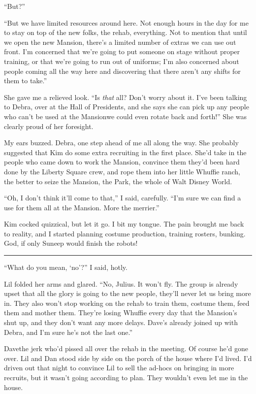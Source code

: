 “But?”

“But we have limited resources around here. Not enough hours in the
day for me to stay on top of the new folks, the rehab, everything.
Not to mention that until we open the new Mansion, there's a
limited number of extras we can use out front. I'm concerned that
we're going to put someone on stage without proper training, or
that we're going to run out of uniforms; I'm also concerned about
people coming all the way here and discovering that there aren't
any shifts for them to take.”

She gave me a relieved look. “Is \emph{that} all? Don't worry about
it. I've been talking to Debra, over at the Hall of Presidents, and
she says she can pick up any people who can't be used at the
Mansion{\dash}we could even rotate back and forth!” She was clearly proud
of her foresight.

My ears buzzed. Debra, one step ahead of me all along the way. She
probably suggested that Kim do some extra recruiting in the first
place. She'd take in the people who came down to work the Mansion,
convince them they'd been hard done by the Liberty Square crew, and
rope them into her little Whuffie ranch, the better to seize the
Mansion, the Park, the whole of Walt Disney World.

“Oh, I don't think it'll come to that,” I said, carefully. “I'm
sure we can find a use for them all at the Mansion. More the
merrier.”

Kim cocked quizzical, but let it go. I bit my tongue. The pain
brought me back to reality, and I started planning costume
production, training rosters, bunking. God, if only Suneep would
finish the robots!

\begin{center}\rule{3in}{0.4pt}\end{center}

“What do you mean, ‘no’?” I said, hotly.

Lil folded her arms and glared. “No, Julius. It won't fly. The
group is already upset that all the glory is going to the new
people, they'll never let us bring more in. They also won't stop
working on the rehab to train them, costume them, feed them and
mother them. They're losing Whuffie every day that the Mansion's
shut up, and they don't want any more delays. Dave's already joined
up with Debra, and I'm sure he's not the last one.”

Dave{\dash}the jerk who'd pissed all over the rehab in the meeting. Of
course he'd gone over. Lil and Dan stood side by side on the porch
of the house where I'd lived. I'd driven out that night to convince
Lil to sell the ad-hocs on bringing in more recruits, but it wasn't
going according to plan. They wouldn't even let me in the house.

